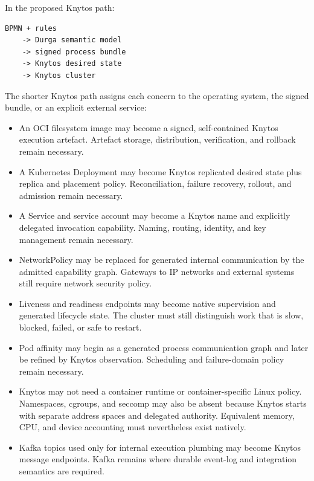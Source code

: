 In the proposed Knytos path:

\begin{verbatim}
BPMN + rules
    -> Durga semantic model
    -> signed process bundle
    -> Knytos desired state
    -> Knytos cluster
\end{verbatim}

The shorter Knytos path assigns each concern to the operating system, the
signed bundle, or an explicit external service:

\begin{itemize}
    \item An OCI filesystem image may become a signed, self-contained Knytos
        execution artefact. Artefact storage, distribution, verification, and
        rollback remain necessary.

    \item A Kubernetes Deployment may become Knytos replicated desired state
        plus replica and placement policy. Reconciliation, failure recovery,
        rollout, and admission remain necessary.

    \item A Service and service account may become a Knytos name and
        explicitly delegated invocation capability. Naming, routing, identity,
        and key management remain necessary.

    \item NetworkPolicy may be replaced for generated internal communication by
        the admitted capability graph. Gateways to IP networks and external
        systems still require network security policy.

    \item Liveness and readiness endpoints may become native supervision and
        generated lifecycle state. The cluster must still distinguish work
        that is slow, blocked, failed, or safe to restart.

    \item Pod affinity may begin as a generated process communication graph and
        later be refined by Knytos observation. Scheduling and failure-domain
        policy remain necessary.

    \item Knytos may not need a container runtime or container-specific
        Linux policy. Namespaces, cgroups, and seccomp may also be absent because
        Knytos starts with separate address spaces and delegated authority.
        Equivalent memory, CPU, and device accounting must nevertheless exist
        natively.

    \item Kafka topics used only for internal execution plumbing may become
        Knytos message endpoints. Kafka remains where durable event-log and
        integration semantics are required.
\end{itemize}

